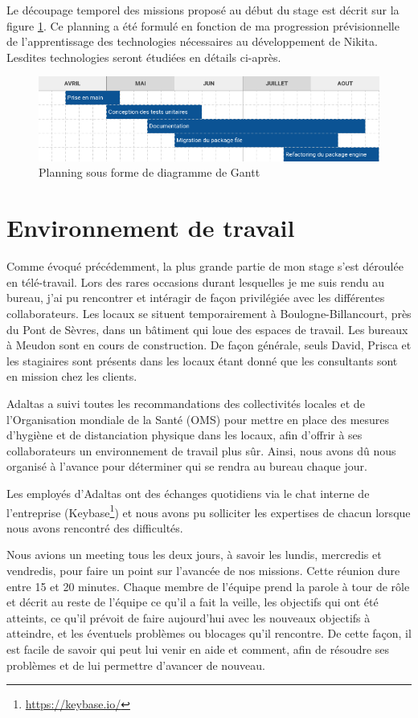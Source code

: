 \documentclass[12pt, french]{report}
\begin{document}
Le découpage temporel des missions proposé au début du stage est décrit sur la figure \ref{fig:planning}. Ce planning a été formulé en fonction de ma progression prévisionnelle de l'apprentissage des technologies nécessaires au développement de Nikita. Lesdites technologies seront étudiées en détails ci-après.

\begin{figure}[h]
\includegraphics[scale=0.6]{assets/img/planning.png}
\centering
\caption{Planning sous forme de diagramme de Gantt}
\label{fig:planning}
\end{figure}

\section{Environnement de travail}

Comme évoqué précédemment, la plus grande partie de mon stage s'est déroulée en télé-travail. Lors des rares occasions durant lesquelles je me suis rendu au bureau, j'ai pu rencontrer et intéragir de façon privilégiée avec les différentes collaborateurs. Les locaux se situent temporairement à Boulogne-Billancourt, près du Pont de Sèvres, dans un bâtiment qui loue des espaces de travail. Les bureaux à Meudon sont en cours de construction. De façon générale, seuls David, Prisca et les stagiaires sont présents dans les locaux étant donné que les consultants sont en mission chez les clients.

Adaltas a suivi toutes les recommandations des collectivités locales et de l’Organisation mondiale de la Santé (OMS) pour mettre en place des mesures d’hygiène et de distanciation physique dans les locaux, afin d’offrir à ses collaborateurs un environnement de travail plus sûr. Ainsi, nous avons dû nous organisé à l'avance pour déterminer qui se rendra au bureau chaque jour.

Les employés d’Adaltas ont des échanges quotidiens via le chat interne de l’entreprise (Keybase\footnote{\href{https://keybase.io/}{https://keybase.io/}}) et nous avons pu solliciter les expertises de chacun lorsque nous avons rencontré des difficultés.

Nous avions un meeting tous les deux jours, à savoir les lundis, mercredis et vendredis, pour faire un point sur l'avancée de nos missions. Cette réunion dure entre 15 et 20 minutes. Chaque membre de l'équipe prend la parole à tour de rôle et décrit au reste de l’équipe ce qu’il a fait la veille, les objectifs qui ont été atteints, ce qu’il prévoit de faire aujourd’hui avec les nouveaux objectifs à atteindre, et les éventuels problèmes ou blocages qu’il rencontre. De cette façon, il est facile de savoir qui peut lui venir en aide et comment, afin de résoudre ses problèmes et de lui permettre d’avancer de nouveau.
\end{document}
